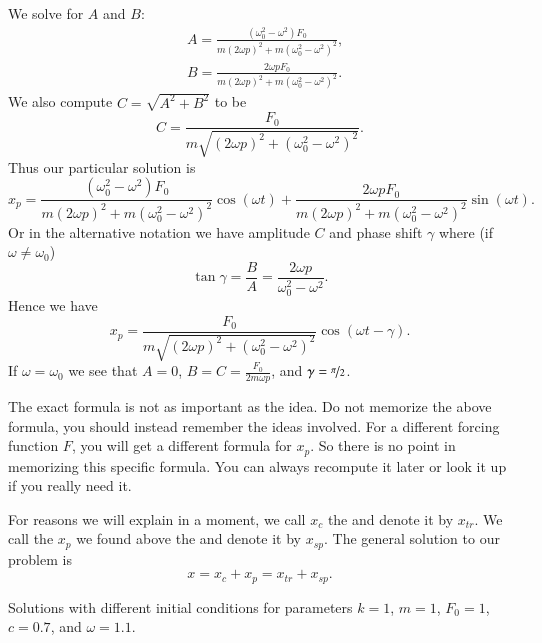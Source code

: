 \documentclass[12pt]{book}
\begin{document}
We solve for $A$ and $B$:
\begin{align*}
& A=\frac{(\omega_0^2-\omega^2) F_0}
{m{(2\omega p)}^2+m{(\omega_0^2-\omega^2)}^2} , \\
& B=\frac{2 \omega p F_0}
{m{(2\omega p)}^2+m{(\omega_0^2-\omega^2)}^2} .
\end{align*}
We also compute $C = \sqrt{A^2+B^2}$
to be
\begin{equation*}
C = \frac{F_0}{m \sqrt{{(2\omega p)}^2+{(\omega_0^2-\omega^2)}^2}} .
\end{equation*}
Thus our particular solution is
\begin{equation*}
x_p = 
\frac{(\omega_0^2-\omega^2) F_0}
{m{(2\omega p)}^2+m{(\omega_0^2-\omega^2)}^2} \cos (\omega t) +
\frac{2 \omega p F_0}
{m{(2\omega p)}^2+m{(\omega_0^2-\omega^2)}^2} \sin (\omega t) .
\end{equation*}
Or in the alternative notation we have amplitude $C$ and phase shift $\gamma$
where (if $\omega \not= \omega_0$)
\begin{equation*}
\tan \gamma = \frac{B}{A} = \frac{2\omega p}{\omega_0^2-\omega^2} .
\end{equation*}
Hence we have
\begin{equation*}
\boxed{~~
x_p = 
\frac{F_0}{m \sqrt{{(2\omega p)}^2+{(\omega_0^2-\omega^2)}^2}} 
\cos ( \omega t - \gamma ) .
~~}
\end{equation*}
If $\omega = \omega_0$ we see that $A=0$, $B = C = \frac{F_0}{2m\omega p}$,
and $\gamma = \nicefrac{\pi}{2}$.

The exact formula is not as important as the idea.  Do not memorize
the above formula, you should instead remember the ideas involved.
For a different forcing function $F$, you will get a different formula
for $x_p$.
So there is no point in memorizing this specific
formula.  You can always recompute it later or look it up if you really need
it.

\medskip

For reasons we will explain in a moment, we call $x_c$ the
\emph{}
and denote it by $x_{tr}$.  We call the
$x_p$ we found above the \emph{} and denote it
by $x_{sp}$.
The general solution to our problem is
\begin{equation*}
x = x_c + x_p = x_{tr} + x_{sp} .
\end{equation*}

\begin{diffyfloatingfigurepdfonly}{3.1in}
\capstart
\begin{center}
\caption{Solutions with different initial conditions for parameters
$k=1$, $m=1$, $F_0 = 1$, $c=0.7$, and $\omega=1.1$.\label{3.6:transbehfig}}
\end{center}
\end{diffyfloatingfigurepdfonly}
\end{document}

